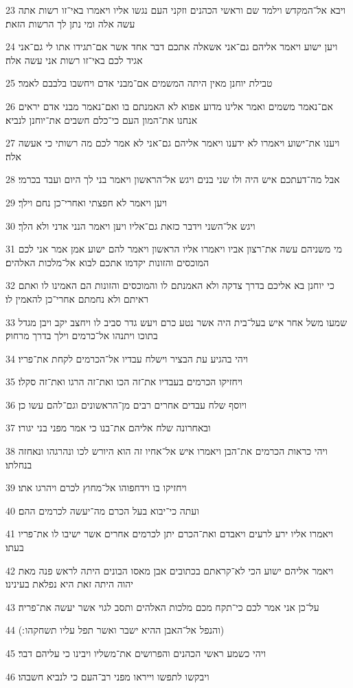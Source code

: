 \par 23 ויבא אל־המקדש וילמד שם וראשי הכהנים וזקני העם נגשו אליו ויאמרו באי־זו רשות אתה עשה אלה ומי נתן לך הרשות הזאת׃
\par 24 ויען ישוע ויאמר אליהם גם־אני אשאלה אתכם דבר אחד אשר אם־תגידו אתו לי גם־אני אגיד לכם באי־זו רשות אני עשה אלה׃
\par 25 טבילת יוחנן מאין היתה המשמים אם־מבני אדם ויחשבו בלבבם לאמר׃
\par 26 אם־נאמר משמים ואמר אלינו מדוע אפוא לא האמנתם בו ואם־נאמר מבני אדם יראים אנחנו את־המון העם כי־כלם חשבים את־יוחנן לנביא׃
\par 27 ויענו את־ישוע ויאמרו לא ידענו ויאמר אליהם גם־אני לא אמר לכם מה רשותי כי אעשה אלה׃
\par 28 אבל מה־דעתכם איש היה ולו שני בנים ויגש אל־הראשון ויאמר בני לך היום ועבד בכרמי׃
\par 29 ויען ויאמר לא חפצתי ואחרי־כן נחם וילך׃
\par 30 ויגש אל־השני וידבר כזאת גם־אליו ויען ויאמר הנני אדני ולא הלך׃
\par 31 מי משניהם עשה את־רצון אביו ויאמרו אליו הראשון ויאמר להם ישוע אמן אמר אני לכם המוכסים והזונות יקדמו אתכם לבוא אל־מלכות האלהים׃
\par 32 כי יוחנן בא אליכם בדרך צדקה ולא האמנתם לו והמוכסים והזונות הם האמינו לו ואתם ראיתם ולא נחמתם אחרי־כן להאמין לו׃
\par 33 שמעו משל אחר איש בעל־בית היה אשר נטע כרם ויעש גדר סביב לו ויחצב יקב ויבן מגדל בתוכו ויתנהו אל־כרמים וילך בדרך מרחוק׃
\par 34 ויהי בהגיע עת הבציר וישלח עבדיו אל־הכרמים לקחת את־פריו׃
\par 35 ויחזיקו הכרמים בעבדיו את־זה הכו ואת־זה הרגו ואת־זה סקלו׃
\par 36 ויוסף שלח עבדים אחרים רבים מן־הראשונים וגם־להם עשו כן׃
\par 37 ובאחרונה שלח אליהם את־בנו כי אמר מפני בני יגורו׃
\par 38 ויהי כראות הכרמים את־הבן ויאמרו איש אל־אחיו זה הוא היורש לכו ונהרגהו ונאחזה בנחלתו׃
\par 39 ויחזיקו בו וידחפוהו אל־מחוץ לכרם ויהרגו אתו׃
\par 40 ועתה כי־יבוא בעל הכרם מה־יעשה לכרמים ההם׃
\par 41 ויאמרו אליו ירע לרעים ויאבדם ואת־הכרם יתן לכרמים אחרים אשר ישיבו לו את־פריו בעתו׃
\par 42 ויאמר אליהם ישוע הכי לא־קראתם בכתובים אבן מאסו הבונים היתה לראש פנה מאת יהוה היתה זאת היא נפלאת בעינינו׃
\par 43 על־כן אני אמר לכם כי־תקח מכם מלכות האלהים ותסב לגוי אשר יעשה את־פריה׃
\par 44 (והנפל אל־האבן ההיא ישבר ואשר תפל עליו תשחקהו ׃)
\par 45 ויהי כשמע ראשי הכהנים והפרושים את־משליו ויבינו כי עליהם דבר׃
\par 46 ויבקשו לתפשו וייראו מפני רב־העם כי לנביא חשבהו׃

